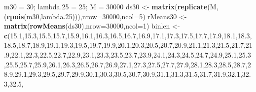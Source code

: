 \documentclass[
]{article}
\newenvironment{Shaded}{\begin{snugshade}}{\end{snugshade}}
\newcommand{\DataTypeTok}[1]{\textcolor[rgb]{0.13,0.29,0.53}{#1}}
\newcommand{\DecValTok}[1]{\textcolor[rgb]{0.00,0.00,0.81}{#1}}
\newcommand{\FloatTok}[1]{\textcolor[rgb]{0.00,0.00,0.81}{#1}}
\newcommand{\KeywordTok}[1]{\textcolor[rgb]{0.13,0.29,0.53}{\textbf{#1}}}
\newcommand{\NormalTok}[1]{#1}
\newcommand{\StringTok}[1]{\textcolor[rgb]{0.31,0.60,0.02}{#1}}
\begin{document}
\begin{Shaded}
\begin{Highlighting}[]
\NormalTok{m30 =}\StringTok{ }\DecValTok{30}\NormalTok{; lambda}\FloatTok{.25}\NormalTok{ =}\StringTok{ }\DecValTok{25}\NormalTok{; M =}\StringTok{ }\DecValTok{30000}
\NormalTok{ds30 <-}\StringTok{ }\KeywordTok{matrix}\NormalTok{(}\KeywordTok{replicate}\NormalTok{(M,(}\KeywordTok{rpois}\NormalTok{(m30,lambda}\FloatTok{.25}\NormalTok{))),}\DataTypeTok{nrow=}\DecValTok{30000}\NormalTok{,}\DataTypeTok{ncol=}\DecValTok{5}\NormalTok{)}
\NormalTok{rMeans30 <-}\StringTok{ }\KeywordTok{matrix}\NormalTok{(}\KeywordTok{rowMeans}\NormalTok{(ds30),}\DataTypeTok{nrow=}\DecValTok{30000}\NormalTok{,}\DataTypeTok{ncol=}\DecValTok{1}\NormalTok{)}
\NormalTok{binlen <-}\StringTok{ }\KeywordTok{c}\NormalTok{(}\FloatTok{15.1}\NormalTok{,}\FloatTok{15.3}\NormalTok{,}\FloatTok{15.5}\NormalTok{,}\FloatTok{15.7}\NormalTok{,}\FloatTok{15.9}\NormalTok{,}\FloatTok{16.1}\NormalTok{,}\FloatTok{16.3}\NormalTok{,}\FloatTok{16.5}\NormalTok{,}\FloatTok{16.7}\NormalTok{,}\FloatTok{16.9}\NormalTok{,}\FloatTok{17.1}\NormalTok{,}\FloatTok{17.3}\NormalTok{,}\FloatTok{17.5}\NormalTok{,}\FloatTok{17.7}\NormalTok{,}\FloatTok{17.9}\NormalTok{,}\FloatTok{18.1}\NormalTok{,}\FloatTok{18.3}\NormalTok{,}\FloatTok{18.5}\NormalTok{,}\FloatTok{18.7}\NormalTok{,}\FloatTok{18.9}\NormalTok{,}\FloatTok{19.1}\NormalTok{,}\FloatTok{19.3}\NormalTok{,}\FloatTok{19.5}\NormalTok{,}\FloatTok{19.7}\NormalTok{,}\FloatTok{19.9}\NormalTok{,}\FloatTok{20.1}\NormalTok{,}\FloatTok{20.3}\NormalTok{,}\FloatTok{20.5}\NormalTok{,}\FloatTok{20.7}\NormalTok{,}\FloatTok{20.9}\NormalTok{,}\FloatTok{21.1}\NormalTok{,}\FloatTok{21.3}\NormalTok{,}\FloatTok{21.5}\NormalTok{,}\FloatTok{21.7}\NormalTok{,}\FloatTok{21.9}\NormalTok{,}\FloatTok{22.1}\NormalTok{,}\FloatTok{22.3}\NormalTok{,}\FloatTok{22.5}\NormalTok{,}\FloatTok{22.7}\NormalTok{,}\FloatTok{22.9}\NormalTok{,}\FloatTok{23.1}\NormalTok{,}\FloatTok{23.3}\NormalTok{,}\FloatTok{23.5}\NormalTok{,}\FloatTok{23.7}\NormalTok{,}\FloatTok{23.9}\NormalTok{,}\FloatTok{24.1}\NormalTok{,}\FloatTok{24.3}\NormalTok{,}\FloatTok{24.5}\NormalTok{,}\FloatTok{24.7}\NormalTok{,}\FloatTok{24.9}\NormalTok{,}\FloatTok{25.1}\NormalTok{,}\FloatTok{25.3}\NormalTok{,}\FloatTok{25.5}\NormalTok{,}\FloatTok{25.7}\NormalTok{,}\FloatTok{25.9}\NormalTok{,}\FloatTok{26.1}\NormalTok{,}\FloatTok{26.3}\NormalTok{,}\FloatTok{26.5}\NormalTok{,}\FloatTok{26.7}\NormalTok{,}\FloatTok{26.9}\NormalTok{,}\FloatTok{27.1}\NormalTok{,}\FloatTok{27.3}\NormalTok{,}\FloatTok{27.5}\NormalTok{,}\FloatTok{27.7}\NormalTok{,}\FloatTok{27.9}\NormalTok{,}\FloatTok{28.1}\NormalTok{,}\FloatTok{28.3}\NormalTok{,}\FloatTok{28.5}\NormalTok{,}\FloatTok{28.7}\NormalTok{,}\FloatTok{28.9}\NormalTok{,}\FloatTok{29.1}\NormalTok{,}\FloatTok{29.3}\NormalTok{,}\FloatTok{29.5}\NormalTok{,}\FloatTok{29.7}\NormalTok{,}\FloatTok{29.9}\NormalTok{,}\FloatTok{30.1}\NormalTok{,}\FloatTok{30.3}\NormalTok{,}\FloatTok{30.5}\NormalTok{,}\FloatTok{30.7}\NormalTok{,}\FloatTok{30.9}\NormalTok{,}\FloatTok{31.1}\NormalTok{,}\FloatTok{31.3}\NormalTok{,}\FloatTok{31.5}\NormalTok{,}\FloatTok{31.7}\NormalTok{,}\FloatTok{31.9}\NormalTok{,}\FloatTok{32.1}\NormalTok{,}\FloatTok{32.3}\NormalTok{,}\FloatTok{32.5}\NormalTok{,}\FloatT
\end{Highlighting}
\end{Shaded}
\end{document}
